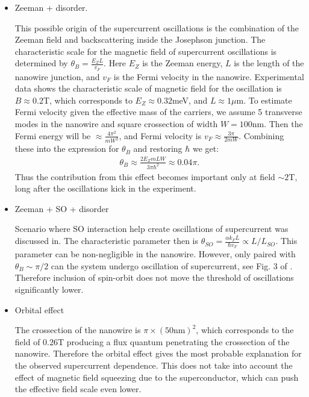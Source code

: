 \documentclass[
10pt, %
a4paper, %
oneside, %
BCOR5mm, %
]{scrartcl}
\begin{document}
\begin{itemize}
\item 
Zeeman + disorder. 

This possible origin of the supercurrent oscillations is the combination of the Zeeman field and backscattering inside the Josephson junction\cite{Yok13}. The characteristic scale for the magnetic field of supercurrent oscillations is determined by $\theta_B = \frac{E_Z L}{v_F}$. Here $E_Z$ is the Zeeman energy, $L$ is the length of the nanowire junction, and $v_F$ is the Fermi velocity in the nanowire. Experimental data shows the characteristic scale of magnetic field for the oscillation is $B\approx 0.2$T, which corresponds to $E_Z\approx 0.32$meV, and $L\approx 1\mu$m. To estimate Fermi velocity given the effective mass of the carriers, we assume 5 transverse modes in the nanowire and square crossection of width $W=100$nm. Then the Fermi energy will be $\approx \frac{4\pi^2}{m W^2}$, and Fermi velocity is $v_F \approx \frac{3\pi}{2m W}$. Combining these into the expression for $\theta_B$ and restoring $\hbar$ we get:
\begin{align}
\theta_B \approx \frac{2 E_Z m L W}{3 \pi \hbar^2}\approx 0.04\pi.
\end{align}
Thus the contribution from this effect becomes important only at field $\sim 2$T, long after the oscillations kick in the experiment.

\item Zeeman + SO + disorder

Scenario where SO interaction help create oscillations of supercurrent was discussed in\cite{Yok14}. The characteristic parameter then is $\theta_{SO} = \frac{\alpha k_F L}{\hbar v_F} \propto L/L_{SO}$. This parameter can be non-negligible in the nanowire. However, only paired with $\theta_B\sim \pi/2$ can the system undergo oscillation of supercurrent, see Fig. 3 of \cite{Yok14}. Therefore inclusion of spin-orbit does not move the threshold of oscillations significantly lower.

\item Orbital effect

The crossection of the nanowire is $\pi\times (50\mathrm{nm})^2$, which corresponds to the field of $0.26$T producing a flux quantum penetrating the crossection of the nanowire. Therefore the orbital effect gives the most probable explanation for the observed supercurrent dependence. This does not take into account the effect of magnetic field squeezing due to the superconductor, which can push the effective field scale even lower.

\end{itemize}
\end{document}
